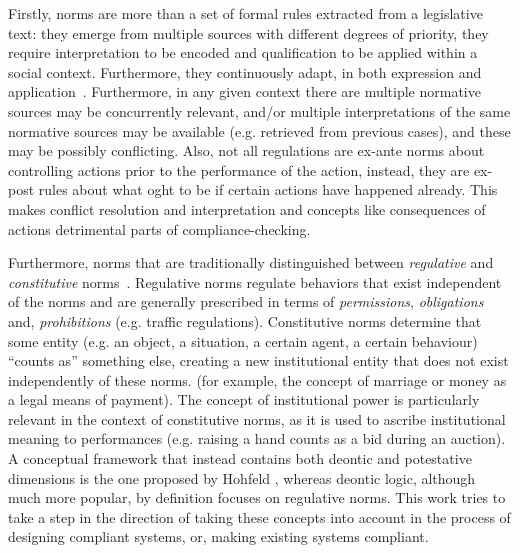 Firstly, norms are more than a set of formal rules extracted from a legislative text: they emerge from multiple sources with different degrees of priority, they require interpretation to be encoded and qualification to be applied within a social context. Furthermore, they continuously adapt, in both expression and application~\cite{Boella2014APractice}. Furthermore, in any given context there are multiple normative sources may be concurrently relevant, and/or multiple interpretations of the same normative sources may be available (e.g. retrieved from previous cases), and these may be possibly conflicting. Also, not all regulations are ex-ante norms about controlling actions prior to the performance of the action, instead, they are ex-post rules about what oght to be if certain actions have happened already. This makes conflict resolution and interpretation and concepts like consequences of actions detrimental parts of compliance-checking.


Furthermore, norms that are traditionally distinguished between \textit{regulative} and \textit{constitutive} norms~\cite{Searle1969,Boella2004RegulativeSystems,Sileno2015}. Regulative norms regulate behaviors that exist independent of the norms and are generally prescribed in terms of \textit{permissions}, \textit{obligations} and, \textit{prohibitions} (e.g. traffic regulations). Constitutive norms determine that some entity (e.g. an object, a situation, a certain agent, a certain behaviour) ``counts as'' something else, creating a new institutional entity that does not exist independently of these norms. (for example, the concept of marriage or money as a legal means of payment). The concept of institutional power is particularly relevant in the context of constitutive norms, as it is used to ascribe institutional meaning to  performances (e.g. raising a hand counts as a bid during an auction). A conceptual framework that instead contains both deontic and potestative dimensions is the one proposed by Hohfeld \cite{hohfeld1917fundamental}, whereas deontic logic, although much more popular, by definition focuses on regulative norms. This work tries to take a step in the direction of taking these concepts into account in the process of designing compliant systems, or, making existing systems compliant.

